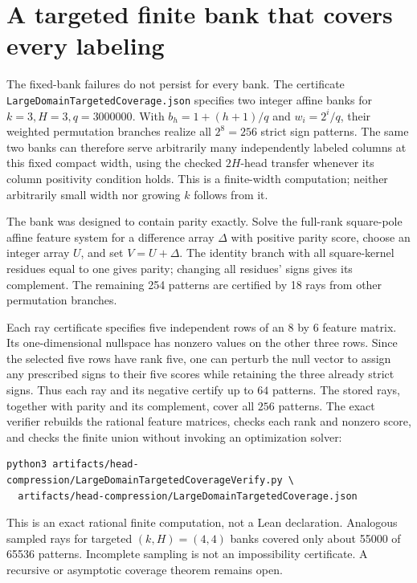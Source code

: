 \documentclass[11pt]{article}
\begin{document}
\section{A targeted finite bank that covers every labeling}
The fixed-bank failures do not persist for every bank. The certificate
\texttt{LargeDomainTargetedCoverage.json} specifies two integer affine
banks for $k=3,H=3,q=3000000$. With
$b_h=1+(h+1)/q$ and $w_i=2^i/q$, their weighted permutation branches
realize all $2^8=256$ strict sign patterns. The same two banks can therefore
serve arbitrarily many independently labeled columns at this fixed
compact width, using the checked $2H$-head transfer whenever its column
positivity condition holds. This is a finite-width computation; neither
arbitrarily small width nor growing $k$ follows from it.

The bank was designed to contain parity exactly. Solve the full-rank
square-pole affine feature system for a difference array $\Delta$ with
positive parity score, choose an integer array $U$, and set $V=U+\Delta$.
The identity branch with all square-kernel residues equal to one gives
parity; changing all residues' signs gives its complement. The remaining
254 patterns are certified by 18 rays from other permutation branches.

Each ray certificate specifies five independent rows of an $8$ by $6$
feature matrix. Its one-dimensional nullspace has nonzero values on the
other three rows. Since the selected five rows have rank five, one can
perturb the null vector to assign any prescribed signs to their five
scores while retaining the three already strict signs. Thus each ray and
its negative certify up to $64$ patterns. The stored rays, together with
parity and its complement, cover all $256$ patterns. The exact verifier
rebuilds the rational feature matrices, checks each rank and nonzero score,
and checks the finite union without invoking an optimization solver:
\begin{verbatim}
python3 artifacts/head-compression/LargeDomainTargetedCoverageVerify.py \
  artifacts/head-compression/LargeDomainTargetedCoverage.json
\end{verbatim}
This is an exact rational finite computation, not a Lean declaration.
Analogous sampled rays for targeted $(k,H)=(4,4)$ banks covered only about
55000 of 65536 patterns. Incomplete sampling is not an impossibility
certificate. A recursive or asymptotic coverage theorem remains open.
\end{document}
